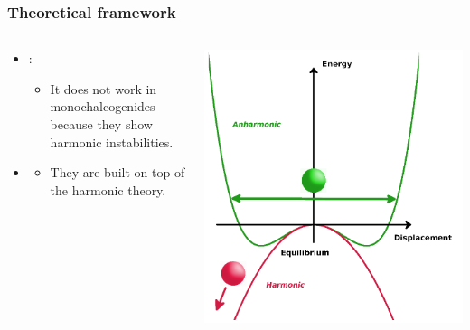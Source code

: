 \documentclass{beamer}
\begin{document}
\begin{frame}

 \frametitle{Theoretical framework}
\begin{columns}
\begin{column}{0.45\textwidth}
 \begin{itemize}
  \item \color{red}{Harmonic approximation}:
  \begin{itemize}
   \item It does not work in monochalcogenides because they show harmonic instabilities.
  \end{itemize}
 \end{itemize}
 \begin{itemize}
  \item \color{red}{Perturbative approaches are not an option.}
  \begin{itemize}
   \item They are built on top of the harmonic theory.
  \end{itemize}
 \end{itemize}
\end{column}
\begin{column}{0.45\textwidth}
 \begin{center}
  \includegraphics[width=0.9\linewidth]{Pictures/THEORY/instability.png}
 \end{center}
\end{column}

\end{columns}
\end{frame}
\end{document}
